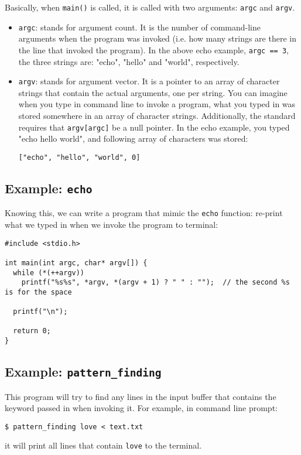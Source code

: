 \documentclass[12pt]{article}
\begin{document}
Basically, when \texttt{main()} is called, it is called with two arguments: \texttt{argc} and \texttt{argv}.
\begin{itemize}
\item \texttt{argc}: stands for argument count. It is the number of command-line arguments when the program was invoked (i.e. how many strings are there in the line that invoked the program). In the above echo example, \texttt{argc == 3}, the three strings are: "echo", "hello" and "world", respectively.
\item \texttt{argv}: stands for argument vector. It is a pointer to an array of character strings that contain the actual arguments, one per string. You can imagine when you type in command line to invoke a program, what you typed in was stored somewhere in an array of character strings. Additionally, the standard requires that \texttt{argv[argc]} be a null pointer. In the echo example, you typed "echo hello world", and following array of characters was stored:
\begin{verbatim}
["echo", "hello", "world", 0]
\end{verbatim}
\end{itemize}

\subsection{Example: \texttt{echo}}
\label{sec:org490218c}
Knowing this, we can write a program that mimic the \texttt{echo} function: re-print what we typed in when we invoke the program to terminal:
\begin{verbatim}
#include <stdio.h>

int main(int argc, char* argv[]) {
  while (*(++argv))
    printf("%s%s", *argv, *(argv + 1) ? " " : "");  // the second %s is for the space

  printf("\n");

  return 0;
}
\end{verbatim}

\subsection{Example: \texttt{pattern\_finding}}
\label{sec:org72a29b0}
This program will try to find any lines in the input buffer that contains the keyword passed in when invoking it. For example, in command line prompt:
\begin{verbatim}
$ pattern_finding love < text.txt
\end{verbatim}
it will print all lines that contain \texttt{love} to the terminal.
\end{document}
